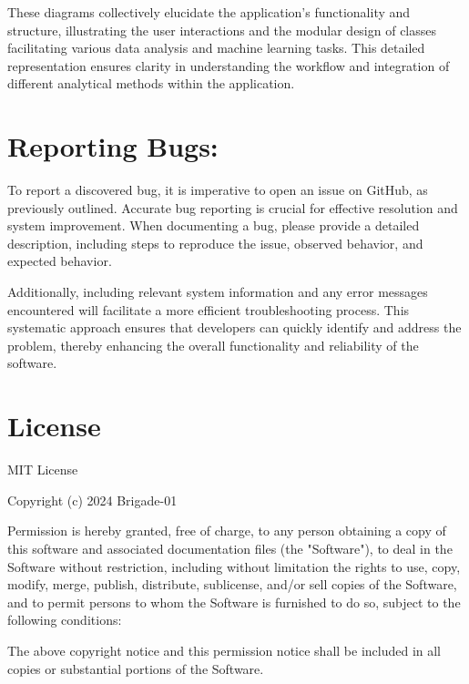 \documentclass[unnumsec,webpdf,contemporary,large]{oup-authoring-template}%
\theoremstyle{thmstyleone}%
\theoremstyle{thmstyletwo}%
\theoremstyle{thmstylethree}%
\begin{document}
These diagrams collectively elucidate the application's functionality and structure, illustrating the user interactions and the modular design of classes facilitating various data analysis and machine learning tasks. This detailed representation ensures clarity in understanding the workflow and integration of different analytical methods within the application.

\section{Reporting Bugs:}\label{sec3}
\vspace{0.2cm}

To report a discovered bug, it is imperative to open an issue on GitHub, as previously outlined. Accurate bug reporting is crucial for effective resolution and system improvement. When documenting a bug, please provide a detailed description, including steps to reproduce the issue, observed behavior, and expected behavior. 
\vspace{0.2cm}

Additionally, including relevant system information and any error messages encountered will facilitate a more efficient troubleshooting process. This systematic approach ensures that developers can quickly identify and address the problem, thereby enhancing the overall functionality and reliability of the software.


\section{License}
MIT License

\vspace{0,5em}

Copyright (c) 2024 Brigade-01
\vspace{0,5em}

Permission is hereby granted, free of charge, to any person obtaining a copy
of this software and associated documentation files (the "Software"), to deal
in the Software without restriction, including without limitation the rights
to use, copy, modify, merge, publish, distribute, sublicense, and/or sell
copies of the Software, and to permit persons to whom the Software is
furnished to do so, subject to the following conditions:

\vspace{0,5em}

The above copyright notice and this permission notice shall be included in all
copies or substantial portions of the Software.
\end{document}
